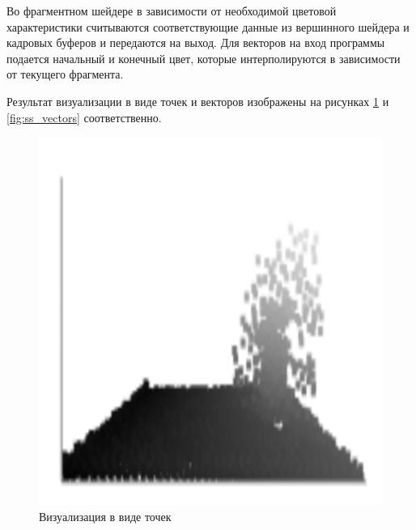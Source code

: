 Во фрагментном шейдере в зависимости от необходимой цветовой характеристики считываются
соответствующие данные из вершинного шейдера и кадровых буферов и передаются на выход.
Для векторов на вход программы подается начальный и конечный цвет, которые
интерполируются в зависимости от текущего фрагмента.

Результат визуализации в виде точек и векторов изображены на рисунках \ref{fig:ss_points} и
\ref{fig:ss_vectors} соответственно.


\begin{figure}
\begin{center}
  \includegraphics[scale=1]{Figures/points}
\end{center}
\caption{Визуализация в виде точек}
\label{fig:ss_points}
\end{figure}

